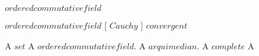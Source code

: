 {	
	{
	{
		\K $ ordered commutative field $
		
	}
	{
		{
		}
	}}



	{
	{
		\K $ ordered commutative field $
	}
	{
		[  $ Cauchy $ ]
		{
			 $ convergent $
		}
	}}



	{
	{
		A $ set $
	}
	{
		A $ ordered commutative field $.
		A $ arquimedian $.
		A $ complete $
	}
	\denote
	{
		A \as \R
	}}
}